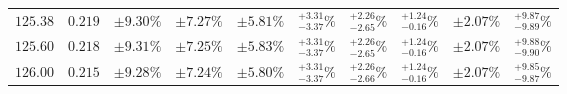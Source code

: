 \begin{table}[ht!]
{{\begin{tabular}{| cc | ccc | cccc | c |}
$125.38$ & $0.219$ & $\pm9.30\%$ & {\color{black!55}$\pm 7.27\%$} & {\color{black!55}$\pm 5.81\%$} & $^{+3.31}_{-3.37}\%$ & {\color{black!55}$^{+2.26}_{-2.65}\%$} & {\color{black!55}$^{+1.24}_{-0.16}\%$} & {\color{black!55}$\pm 2.07\%$} & $^{+9.87}_{-9.89}\%$  \\
$125.60$ & $0.218$ & $\pm9.31\%$ & {\color{black!55}$\pm 7.25\%$} & {\color{black!55}$\pm 5.83\%$} & $^{+3.31}_{-3.37}\%$ & {\color{black!55}$^{+2.26}_{-2.65}\%$} & {\color{black!55}$^{+1.24}_{-0.16}\%$} & {\color{black!55}$\pm 2.07\%$} & $^{+9.88}_{-9.90}\%$  \\
$126.00$ & $0.215$ & $\pm9.28\%$ & {\color{black!55}$\pm 7.24\%$} & {\color{black!55}$\pm 5.80\%$} & $^{+3.31}_{-3.37}\%$ & {\color{black!55}$^{+2.26}_{-2.66}\%$} & {\color{black!55}$^{+1.24}_{-0.16}\%$} & {\color{black!55}$\pm 2.07\%$} & $^{+9.85}_{-9.87}\%$  \\

\end{tabular}}}
\end{table}
